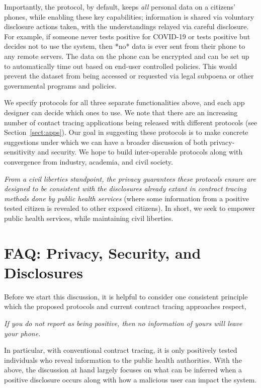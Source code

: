 \documentclass{article}
\begin{document}
Importantly, the protocol, by default, keeps \emph{all} personal data on a citizens' phones, while enabling these key capabilities; information is shared via voluntary disclosure actions taken, with the understandings relayed via careful disclosure. For example, if someone never tests positive for COVID-19 or tests positive but decides not to use the system, then *no* data is ever sent from their phone to any remote servers. The data on the phone can be encrypted and can be set up to automatically time out based on end-user controlled policies.  This would prevent the dataset from being accessed or requested via legal subpoena or other governmental programs and policies.

 We specify protocols for all three separate functionalities above, and each app designer can decide which ones to use. We note that there are an increasing number of contact tracing applications being released with different protocols (see Section~\ref{sect:apps}). Our goal in suggesting these protocols is to make concrete suggestions under which we can have a broader discussion of both privacy-sensitivity and security. We hope to build inter-operable protocols along with convergence from industry, academia, and civil society.
 
 \emph{From a civil liberties standpoint, the privacy guarantees these protocols ensure are designed to be consistent with the disclosures already extant in contract tracing methods done by public health services} (where some information from a positive tested citizen is revealed to other exposed citizens). In short, we seek to empower public health services, while maintaining civil liberties.


\section{FAQ: Privacy, Security, and Disclosures} \label{sect:FAQ}

Before we start this discussion, it is helpful to consider one consistent principle which the proposed protocols and current contract tracing approaches respect,

\begin{center}
\emph{If you do not report as being positive, then no information of yours will leave your phone.}
\end{center}

In particular, with conventional contract tracing, it is only positively tested individuals who reveal information to the public health authorities. With the above, the discussion at hand largely focuses on what can be inferred when a positive disclosure occurs along with how a malicious user can impact the system.
\end{document}
